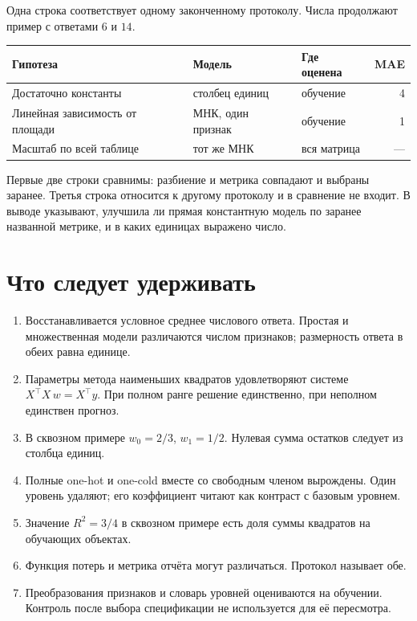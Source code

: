 \documentclass[11pt,a4paper]{article}
\begin{document}
Одна строка соответствует одному законченному протоколу. Числа продолжают пример с ответами \(6\) и \(14\).

\begin{center}
\begin{tabular}{@{}p{48mm}p{34mm}p{28mm}r@{}}
\toprule
Гипотеза & Модель & Где оценена & MAE\\
\midrule
Достаточно константы & столбец единиц & обучение & 4\\
Линейная зависимость от площади & МНК, один признак & обучение & 1\\
Масштаб по всей таблице & тот же МНК & вся матрица & ---\\
\bottomrule
\end{tabular}
\end{center}

Первые две строки сравнимы: разбиение и метрика совпадают и выбраны заранее. Третья строка относится к другому протоколу и в сравнение не входит. В выводе указывают, улучшила ли прямая константную модель по заранее названной метрике, и в каких единицах выражено число.

\section{Что следует удерживать}

\begin{enumerate}
\item Восстанавливается условное среднее числового ответа. Простая и множественная модели различаются числом признаков; размерность ответа в обеих равна единице.
\item Параметры метода наименьших квадратов удовлетворяют системе \(X^{\top}X\,w=X^{\top}y\). При полном ранге решение единственно, при неполном единствен прогноз.
\item В сквозном примере \(w_0=2/3\), \(w_1=1/2\). Нулевая сумма остатков следует из столбца единиц.
\item Полные one-hot и one-cold вместе со свободным членом вырождены. Один уровень удаляют; его коэффициент читают как контраст с базовым уровнем.
\item Значение \(R^{2}=3/4\) в сквозном примере есть доля суммы квадратов на обучающих объектах.
\item Функция потерь и метрика отчёта могут различаться. Протокол называет обе.
\item Преобразования признаков и словарь уровней оцениваются на обучении. Контроль после выбора спецификации не используется для её пересмотра.
\end{enumerate}
\end{document}
